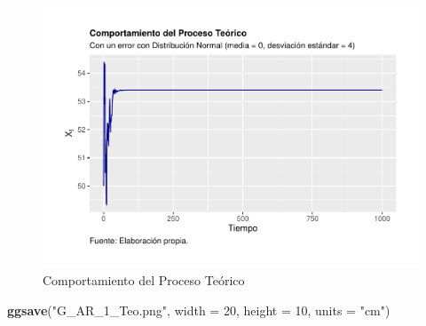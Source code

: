 \documentclass[
]{book}
\newenvironment{Shaded}{\begin{snugshade}}{\end{snugshade}}
\newcommand{\AttributeTok}[1]{\textcolor[rgb]{0.13,0.29,0.53}{#1}}
\newcommand{\DecValTok}[1]{\textcolor[rgb]{0.00,0.00,0.81}{#1}}
\newcommand{\FunctionTok}[1]{\textcolor[rgb]{0.13,0.29,0.53}{\textbf{#1}}}
\newcommand{\NormalTok}[1]{#1}
\newcommand{\SpecialCharTok}[1]{\textcolor[rgb]{0.81,0.36,0.00}{\textbf{#1}}}
\newcommand{\StringTok}[1]{\textcolor[rgb]{0.31,0.60,0.02}{#1}}
\begin{document}
\begin{figure}

{\centering \includegraphics{Notas-Series-Tiempo_files/figure-latex/fig42-1} 

}

\caption{Comportamiento del Proceso Teórico}\label{fig:fig42}
\end{figure}

\begin{Shaded}
\begin{Highlighting}[]
\FunctionTok{ggsave}\NormalTok{(}\StringTok{"G\_AR\_1\_Teo.png"}\NormalTok{, }\AttributeTok{width =} \DecValTok{20}\NormalTok{, }\AttributeTok{height =} \DecValTok{10}\NormalTok{, }\AttributeTok{units =} \StringTok{"cm"}\NormalTok{)}
\end{Highlighting}
\end{Shaded}

\begin{Shaded}
\end{Shaded}
\end{document}
